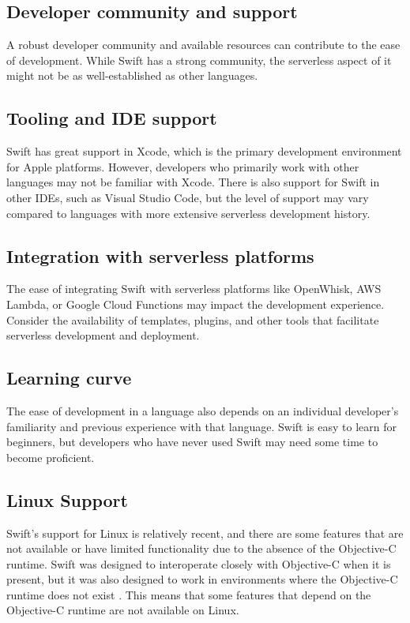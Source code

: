 \subsection{Developer community and support}

A robust developer community and available resources can contribute to the ease of development. While Swift has a strong community, the serverless aspect of it might not be as well-established as other languages.

\subsection{Tooling and IDE support}

Swift has great support in Xcode, which is the primary development environment for Apple platforms. However, developers who primarily work with other languages may not be familiar with Xcode. There is also support for Swift in other IDEs, such as Visual Studio Code, but the level of support may vary compared to languages with more extensive serverless development history.

\subsection{Integration with serverless platforms}

The ease of integrating Swift with serverless platforms like OpenWhisk, AWS Lambda, or Google Cloud Functions may impact the development experience. Consider the availability of templates, plugins, and other tools that facilitate serverless development and deployment.

\subsection{Learning curve}

The ease of development in a language also depends on an individual developer's familiarity and previous experience with that language. Swift is easy to learn for beginners, but developers who have never used Swift may need some time to become proficient.
    
\subsection{Linux Support}

Swift's support for Linux is relatively recent, and there are some features that are not available or have limited functionality due to the absence of the Objective-C runtime. Swift was designed to interoperate closely with Objective-C when it is present, but it was also designed to work in environments where the Objective-C runtime does not exist
. This means that some features that depend on the Objective-C runtime are not available on Linux.

